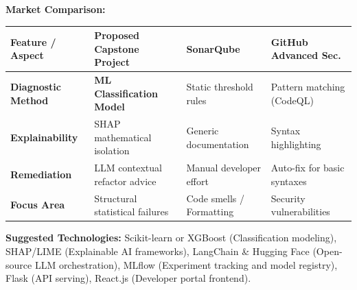 \documentclass[11pt, a4paper]{article}
\begin{document}
\vspace{0.4cm}
\noindent\textbf{Market Comparison:}

\vspace{0.2cm}
\noindent\renewcommand{\arraystretch}{1.5}
\begin{tabular}{|p{3.5cm}|p{4.5cm}|p{3.8cm}|p{3.8cm}|}
\hline
\textbf{Feature / Aspect} & \textbf{Proposed Capstone Project} & \textbf{SonarQube} & \textbf{GitHub Advanced Sec.} \\
\hline
\textbf{Diagnostic Method} & \textbf{ML Classification Model} & Static threshold rules & Pattern matching (CodeQL)\\
\hline
\textbf{Explainability} & SHAP mathematical isolation & Generic documentation & Syntax highlighting \\
\hline
\textbf{Remediation} & LLM contextual refactor advice & Manual developer effort & Auto-fix for basic syntaxes\\
\hline
\textbf{Focus Area} & Structural statistical failures & Code smells / Formatting & Security vulnerabilities \\
\hline
\end{tabular}

\vspace{0.4cm}
\noindent\textbf{Suggested Technologies:} Scikit-learn or XGBoost (Classification modeling), SHAP/LIME (Explainable AI frameworks), LangChain \& Hugging Face (Open-source LLM orchestration), MLflow (Experiment tracking and model registry), Flask (API serving), React.js (Developer portal frontend).
\end{document}
